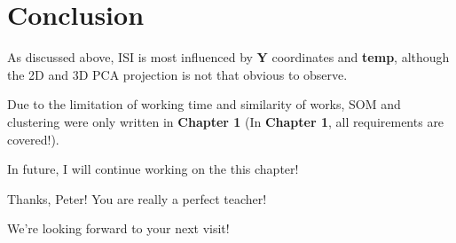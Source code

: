\documentclass[titlepage,a4paper,12pt,thmsb]{report}
\begin{document}
\begin{center}
\begin{figure}[h]
{\par}
\end{figure}
{}
\end{center}

\newpage

\begin{center}
\begin{figure}[h]
{\par}
\end{figure}
{}
\end{center}

\begin{center}
\begin{figure}[h]
{\par}
\end{figure}
{}
\end{center}

\newpage

\section{Conclusion}

As discussed above, ISI is most influenced by {\bf{Y}} coordinates and {\bf{temp}}, although the 2D and 3D PCA projection is not that obvious to observe.

Due to the limitation of working time and similarity of works, SOM and clustering were only written in {\bf{Chapter 1}} (In {\bf{Chapter 1}}, all requirements are covered!).

In future, I will continue working on the this chapter!

Thanks, Peter! You are really a perfect teacher!

We're looking forward to your next visit!



\end{document}
